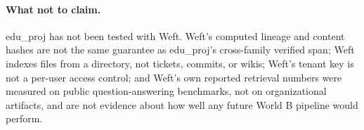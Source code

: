 \paragraph{What not to claim.}
edu\_proj has not been tested with Weft. Weft's computed lineage and content hashes are not the
same guarantee as edu\_proj's cross-family verified span; Weft indexes files from a directory, not
tickets, commits, or wikis; Weft's tenant key is not a per-user access control; and Weft's own
reported retrieval numbers were measured on public question-answering benchmarks, not on
organizational artifacts, and are not evidence about how well any future World B pipeline would
perform.
